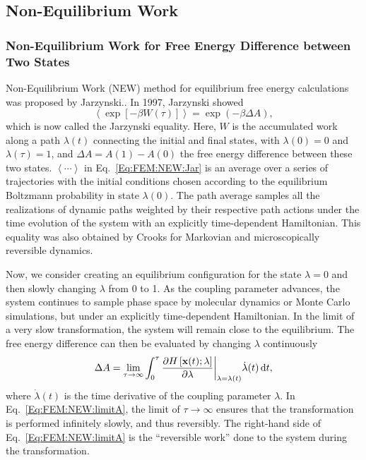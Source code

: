 \subsection{Non-Equilibrium Work\label{Sec:FEM:NEW}}
\subsubsection{Non-Equilibrium Work for Free Energy Difference between Two States\label{Sec:FEM:NEW:StateFE}}
Non-Equilibrium Work (NEW) method for equilibrium free energy calculations was proposed by Jarzynski.\cite{JarzynskiPRL1997}. 
In 1997, Jarzynski showed
\begin{equation}
    \left< \exp\left[-\beta W(\tau)\right] \right> = \exp{(-\beta \Delta A)},
    \label{Eq:FEM:NEW:Jar}
\end{equation}
which is now called the Jarzynski equality. Here, $W$ is the accumulated work along a path $\lambda(t)$ connecting the initial and final states, with $\lambda(0)=0$ and $\lambda(\tau)=1$, and $\Delta A = A(1) - A(0)$ the free energy difference between these two states. 
$\left \langle \cdots \right \rangle$ in Eq.~\ref{Eq:FEM:NEW:Jar} is an average over a series of trajectories with the initial conditions chosen according to the equilibrium Boltzmann probability in state $\lambda(0)$. The path average samples all the realizations of dynamic paths weighted by their respective path actions under the time evolution of the system with an explicitly time-dependent Hamiltonian. This equality was also obtained by Crooks for Markovian and microscopically reversible dynamics.\cite{CrooksJSP1998} 

Now, we consider creating an equilibrium configuration for the state $\lambda=0$ and then slowly changing $\lambda$ from 0 to 1. As the coupling parameter advances, the system continues to sample phase space by molecular dynamics or Monte Carlo simulations, but under an explicitly time-dependent Hamiltonian. In the limit of a very slow transformation, the system will remain close to the equilibrium. The free energy difference can then be evaluated by changing $\lambda$ continuously
\begin{equation}
    \Delta A =\lim_{\tau\to\infty} \int_{0}^{\tau} {\frac{\partial{H\left[\textbf{x}(t);\lambda\right]}}{\partial{\lambda}}\bigg\rvert}_{\lambda=\lambda(t)} \dot{\lambda}(t) \mathop{}\!\mathrm{d} t,
    \label{Eq:FEM:NEW:limitA}
\end{equation}  
where $\dot{\lambda}(t)$ is the time derivative of the coupling parameter $\lambda$. In Eq.~\ref{Eq:FEM:NEW:limitA}, the limit of $\tau\to\infty$ ensures that the transformation is performed infinitely slowly, and thus reversibly. The right-hand side of Eq.~\ref{Eq:FEM:NEW:limitA} is the ``reversible work'' done to the system during the transformation.

